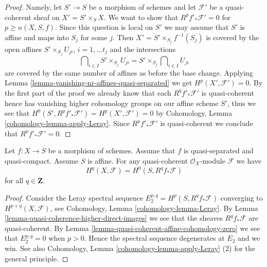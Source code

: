 \begin{proof}
\medskip\noindent
Namely, let $S' \to S$ be a morphism of schemes and let
$\mathcal{F}'$ be a quasi-coherent sheaf on $X' = S' \times_S X$.
We want to show that $R^pf'_*\mathcal{F}' = 0$ for $p \geq n(X, S, f)$.
Since this question is local on $S'$ we may assume that $S'$ is affine
and maps into $S_j$ for some $j$. Then $X' = S' \times_{S_j} f^{-1}(S_j)$
is covered by the open affines $S' \times_{S_j} U_{ji}$, $i = 1, \ldots t_j$
and the intersections
$$
\bigcap\nolimits_{i \in I} S' \times_{S_j} U_{ji} =
S' \times_{S_j} \bigcap\nolimits_{i \in I} U_{ji}
$$
are covered by the same number of affines as before the base change.
Applying
Lemma \ref{lemma-vanishing-nr-affines-quasi-separated}
we get $H^p(X', \mathcal{F}') = 0$. By the first part of the proof
we already know that each $R^qf'_*\mathcal{F}'$ is quasi-coherent
hence has vanishing higher cohomology groups on our affine scheme $S'$,
thus we see that $H^0(S', R^pf'_*\mathcal{F}') = H^p(X', \mathcal{F}') = 0$
by Cohomology, Lemma \ref{cohomology-lemma-apply-Leray}.
Since $R^pf'_*\mathcal{F}'$ is quasi-coherent
we conclude that $R^pf'_*\mathcal{F}' = 0$.
\end{proof}

\begin{lemma}
\label{lemma-quasi-coherence-higher-direct-images-application}
Let $f : X \to S$ be a morphism of schemes.
Assume that $f$ is quasi-separated and quasi-compact.
Assume $S$ is affine.
For any quasi-coherent $\mathcal{O}_X$-module $\mathcal{F}$
we have
$$
H^q(X, \mathcal{F}) = H^0(S, R^qf_*\mathcal{F})
$$
for all $q \in \mathbf{Z}$.
\end{lemma}

\begin{proof}
Consider the Leray spectral sequence $E_2^{p, q} = H^p(S, R^qf_*\mathcal{F})$
converging to $H^{p + q}(X, \mathcal{F})$, see
Cohomology, Lemma \ref{cohomology-lemma-Leray}.
By Lemma \ref{lemma-quasi-coherence-higher-direct-images}
we see that the sheaves $R^qf_*\mathcal{F}$ are quasi-coherent.
By Lemma \ref{lemma-quasi-coherent-affine-cohomology-zero}
we see that $E_2^{p, q} = 0$ when $p > 0$.
Hence the spectral sequence degenerates at $E_2$ and we win.
See also
Cohomology, Lemma \ref{cohomology-lemma-apply-Leray} (2)
for the general principle.
\end{proof}








